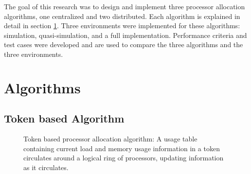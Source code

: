 \documentclass{report}
\begin{document}
The goal of this research was to design and implement three processor
allocation algorithms, one centralized and two distributed.  Each algorithm
is explained in detail in section \ref{algorithms}.  Three environments were
implemented for these algorithms: simulation, quasi-simulation, and a full
implementation.  Performance criteria and test cases were developed and are
used to compare the three algorithms and the three environments.




\section{Algorithms}
\label{algorithms}


\subsection{Token based Algorithm}

\begin{figure}
	\resizebox{\textwidth}{!}
	{}
	\caption[Token based Algorithm]{Token based processor allocation
	algorithm: A usage table containing current load and memory usage
	information in a token circulates around a logical ring of
	processors, updating information as it circulates.}
	\label{fig:token}
\end{figure}
\end{document}
